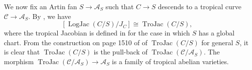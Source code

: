 \documentclass[11pt]{amsart}
\theoremstyle{definition}
\theoremstyle{remark}
\DeclareMathOperator{\LogJac}{LogJac}
\DeclareMathOperator{\TroJac}{TroJac}
\begin{document}
We now fix an Artin fan $S\to \mathcal{A}_S$ such
that $C\to S$ descends to a tropical curve $\mathcal{C}\to \mathcal{A}_S$. By
\cite[Theorem 4.9.4]{TheLogarithmicMolcho2022}, we have
$$[\LogJac(C/S)/J_C]\cong \TroJac(C/S),$$
where the tropical
Jacobian is defined in
\cite[Definition 3.6.1]{TheLogarithmicMolcho2022} for the case
in which $S$ has a global chart. From the construction on
page 1510 of \cite{TheLogarithmicMolcho2022} of $\TroJac(C/S)$
for general $S$, it is clear that $\TroJac(C/S)$ is the
pull-back of $\TroJac(\mathcal{C}/\mathcal{A}_S)$. The morphism
$\TroJac(\mathcal{C}/\mathcal{A}_S)\to \mathcal{A}_S$ is a family of tropical
abelian varieties.

\begin{figure}
	\resizebox{\textwidth}{!}{\begin{tikzpicture}[scale=1.5]


\end{tikzpicture}}
\end{figure}
\end{document}
